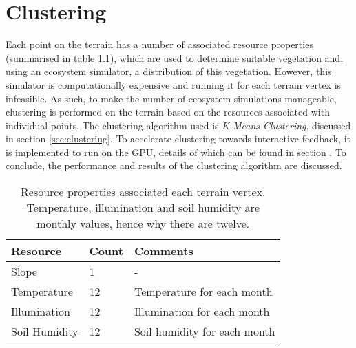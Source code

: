 \chapter{Clustering} \label{chap:clustering}

Each point on the terrain has a number of associated resource properties (summarised in table \ref{tab:point_resources}), which are used to determine suitable vegetation and, using an ecosystem simulator, a distribution of this vegetation. However, this simulator is computationally expensive and running it for each terrain vertex is infeasible. As such, to make the number of ecosystem simulations manageable, clustering is performed on the terrain based on the resources associated with individual points. The clustering algorithm used is \textit{K-Means Clustering}, discussed in section \ref{sec:clustering}. To accelerate clustering towards interactive feedback, it is implemented to run on the GPU, details of which can be found in section \label{sec:gpu_clustering}. To conclude, the performance and results of the clustering algorithm are discussed.

\begin{table}[h]
  \centering
	    \begin{tabular}{|p{6cm}|p{3cm}|p{6cm}|}
		\hline	
  	    \textbf{Resource} & \textbf{Count} & \textbf{Comments} \\
  	    \hline	
  	    Slope & 1 & - \\
		\hline
  	    Temperature & 12 & Temperature for each month \\
		\hline
  	    Illumination & 12 & Illumination for each month \\
		\hline
  	    Soil Humidity & 12 & Soil humidity for each month \\
		\hline
		\end{tabular}
		\caption{Resource properties associated each terrain vertex. Temperature, illumination and soil humidity are monthly values, hence why there are twelve.}
	  \label{tab:point_resources}
\end{table}



